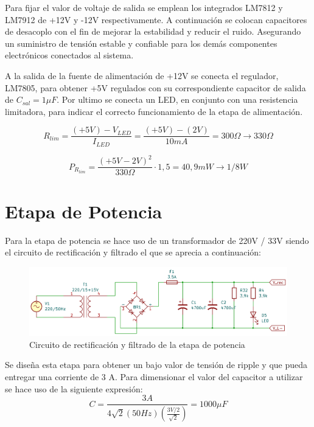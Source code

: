 Para fijar el valor de voltaje de salida se emplean los integrados LM7812 y LM7912 de +12V y -12V respectivamente. A continuación se colocan capacitores de desacoplo con el fin de mejorar la estabilidad y reducir el ruido. Asegurando un suministro de tensión estable y confiable para los demás componentes electrónicos conectados al sistema. \par 
A la salida de la fuente de alimentación de +12V se conecta el regulador, LM7805, para obtener +5V regulados con su correspondiente capacitor de salida de $C_{sal} =1\mu F$. Por ultimo se conecta un LED, en conjunto con una resistencia limitadora, para indicar el correcto funcionamiento de la etapa de alimentación. \par 
\begin{equation}
R_{lim} =\frac{(+5V)-V_{LED} }{I_{LED} }=\frac{(+5V)-(2V)}{10mA}=300\Omega \to 330\Omega
\end{equation} \par 
\begin{equation}
P_{R_{lim} } =\frac{(+5V-2V)^2 }{330\Omega }\cdot 1,5=40,9mW\to 1/8W
\end{equation}

\section{Etapa de Potencia}\par

Para la etapa de potencia se hace uso de un transformador de 220V / 33V siendo el circuito de rectificación y filtrado el que se aprecia a continuación:

\begin{figure} [H]
	\centering
	\includegraphics[width=\textwidth]{./imagenes/Rectificador_potencia.png}
	\caption{Circuito de rectificación y filtrado de la etapa de potencia}
	\label{F:rectificador_potencia}
\end{figure} \par 

Se diseña esta etapa para obtener un bajo valor de tensión de ripple y que pueda entregar una corriente de 3 A. Para dimensionar el valor del capacitor a utilizar se hace uso de la siguiente expresión:
\begin{equation}
C=\frac{3A}{4\sqrt{2}(50Hz)(\frac{3V/2}{\sqrt{2}})}=1000\mu F
\end{equation} \par 

